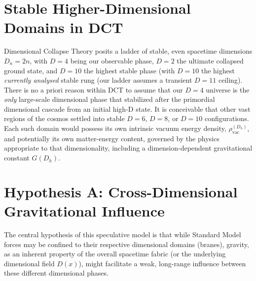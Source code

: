 \documentclass[a4paper, 12pt, oneside]{book}
\numberwithin{equation}{chapter}
\begin{document}
\section{Stable Higher-Dimensional Domains in DCT}
\label{sec:HigherDStable}
Dimensional Collapse Theory posits a ladder of stable, even spacetime dimensions $D_n = 2n$, with $D=4$ being our observable phase, $D=2$ the ultimate collapsed ground state, and $D=10$ the highest stable phase (with $D=10$ the highest \emph{currently analysed} stable rung (our ladder assumes a transient $D=11$ ceiling). There is no a priori reason within DCT to assume that our $D=4$ universe is the \emph{only} large-scale dimensional phase that stabilized after the primordial dimensional cascade from an initial high-D state. It is conceivable that other vast regions of the cosmos settled into stable $D=6$, $D=8$, or $D=10$ configurations. Each such domain would possess its own intrinsic vacuum energy density, $\rho_{\text{vac}}^{(D_h)}$, and potentially its own matter-energy content, governed by the physics appropriate to that dimensionality, including a dimension-dependent gravitational constant $G(D_h)$.

\section[Hypothesis A: Gravitational Influence]{Hypothesis A: Cross-Dimensional Gravitational Influence}
\label{sec:CrossDimGrav}
The central hypothesis of this speculative model is that while Standard Model forces may be confined to their respective dimensional domains (branes), gravity, as an inherent property of the overall spacetime fabric (or the underlying dimensional field $D(x)$), might facilitate a weak, long-range influence between these different dimensional phases.
\end{document}
